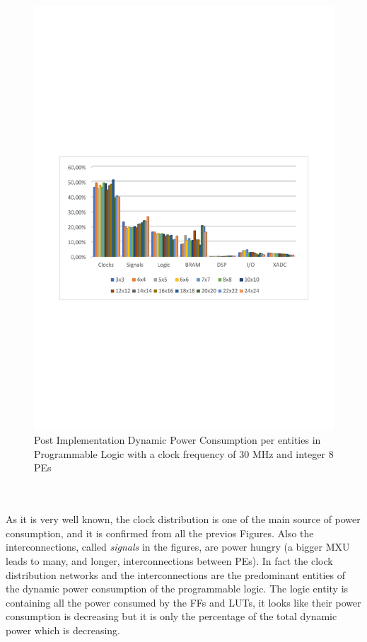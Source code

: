 \begin{itemize}
\begin{figure}[!htbp]
\includegraphics[scale=0.7,angle=0]{./figure/graphs/power_pldyn_div_int8_freq_30mhz.pdf}
\caption{Post Implementation Dynamic Power Consumption per entities in Programmable Logic with a clock frequency of 30 MHz and integer 8 PEs}
\label{fig:dynpowint8ent30}
\end{figure}
\\\\
As it is very well known, the clock distribution is one of the main source of power consumption, and it is confirmed from all the previos Figures. Also the interconnections, called \textit{signals} in the figures, are power hungry (a bigger MXU leads to many, and longer, interconnections between PEs). In fact the clock distribution networks and the interconnections are the predominant entities of the dynamic power consumption of the programmable logic.
The logic entity is containing all the power consumed by the FFs and LUTs, it looks like their power consumption is decreasing but it is only the percentage of the total dynamic power which is decreasing.

\end{itemize}
